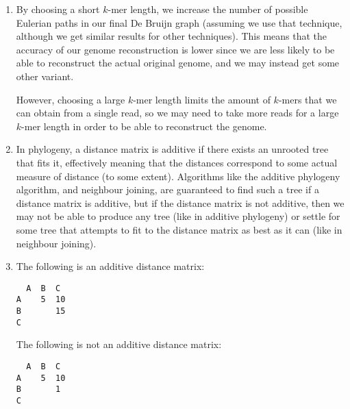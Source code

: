\begin{enumerate}[label=(\alph*)]
\item
  By choosing a short $k$-mer length, we increase the number of possible Eulerian paths in our final De Bruijn graph (assuming we use that technique, although we get similar results for other techniques). This means that the accuracy of our genome reconstruction is lower since we are less likely to be able to reconstruct the actual original genome, and we may instead get some other variant.

  However, choosing a large $k$-mer length limits the amount of $k$-mers that we can obtain from a single read, so we may need to take more reads for a large $k$-mer length in order to be able to reconstruct the genome.

\item
  In phylogeny, a distance matrix is additive if there exists an unrooted tree that fits it, effectively meaning that the distances correspond to some actual measure of distance (to some extent). Algorithms like the additive phylogeny algorithm, and neighbour joining, are guaranteed to find such a tree if a distance matrix is additive, but if the distance matrix is not additive, then we may not be able to produce any tree (like in additive phylogeny) or settle for some tree that attempts to fit to the distance matrix as best as it can (like in neighbour joining).

\item
  The following is an additive distance matrix:

\begin{verbatim}
  A  B  C
A    5  10
B       15
C
\end{verbatim}

The following is not an additive distance matrix:

\begin{verbatim}
  A  B  C
A    5  10
B       1
C
\end{verbatim}


        
\end{enumerate}

